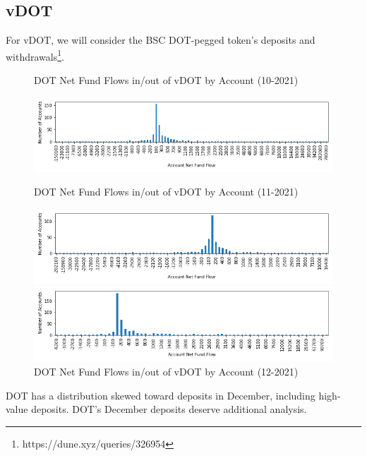 \documentclass[12pt]{article}
\begin{document}
        \subsection*{vDOT}
            For vDOT, we will consider the BSC DOT-pegged token's deposits and withdrawals\footnote{https://dune.xyz/queries/326954}.
            \begin{figure}[h]
                \caption{DOT Net Fund Flows in/out of vDOT by Account (10-2021) \label{overflow}}
                \centering
                \hspace*{-1in}
                \includegraphics[width=0.8\paperwidth]{net-fundflow-accountdist-vDOT-10-2021.png}

                \caption{DOT Net Fund Flows in/out of vDOT by Account (11-2021) \label{overflow}}
                \centering
                \hspace*{-1in}
                \includegraphics[width=0.8\paperwidth]{net-fundflow-accountdist-vDOT-11-2021.png}

                \caption{DOT Net Fund Flows in/out of vDOT by Account (12-2021) \label{overflow}}
                \centering
                \hspace*{-1in}
                \includegraphics[width=0.8\paperwidth]{net-fundflow-accountdist-vDOT-12-2021.png}
            \end{figure}

            DOT has a distribution skewed toward deposits in December, including high-value deposits. DOT's December deposits deserve additional analysis.
            \clearpage
\end{document}
